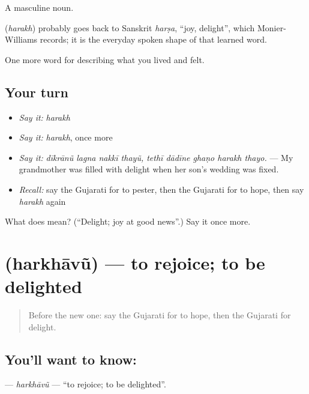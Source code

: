 A masculine noun.

\begin{cousinweb}
\textbf{} (\emph{harakh}) probably goes back to Sanskrit \emph{harṣa}, \textquotedblleft{}joy, delight\textquotedblright{}, which Monier-Williams records; it is the everyday spoken shape of that learned word.
\end{cousinweb}

\begin{grammarlens}[title={What you've built}]
One more word for describing what you lived and felt.
\end{grammarlens}

\subsection*{Your turn}
\begin{itemize}
\raggedright
  \item \emph{Say it:} \emph{harakh}
  \item \emph{Say it:} \emph{harakh}, once more
  \item \emph{Say it:} \emph{dīkrānũ lagna nakkī thayũ, tethī dādīne ghaṇo harakh thayo.} — My grandmother was filled with delight when her son's wedding was fixed.
  \item \emph{Recall:} say the Gujarati for to pester, then the Gujarati for to hope, then say \emph{harakh} again
\end{itemize}

\begin{tcolorbox}[breakable,colback=teal!4,colframe=teal!35!black,title={Before you move on}]
What does  mean? (\textquotedblleft{}Delight; joy at good news\textquotedblright{}.) Say it once more.
\end{tcolorbox}
\section[\texorpdfstring{\gu{હરખાવું} (harkhāvũ)}{હરખાવું (harkhāvũ)}]{ (harkhāvũ) — to rejoice; to be delighted}

\label{lesson:GU-C447-harkhavu}



\begin{quote}
Before the new one: say the Gujarati for to hope, then the Gujarati for delight.
\end{quote}

\subsection*{You'll want to know: }
\textbf{} — \emph{harkhāvũ} — \textquotedblleft{}to rejoice; to be delighted\textquotedblright{}.

